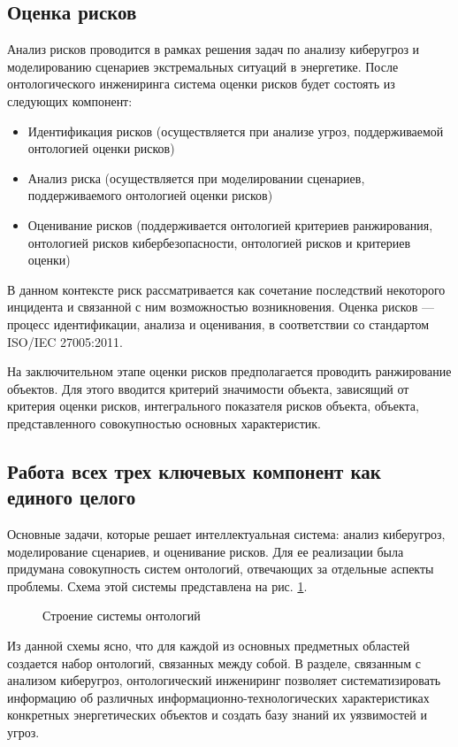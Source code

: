 \subsection{Оценка рисков}
Анализ рисков проводится в рамках решения задач по анализу киберугроз и моделированию сценариев
экстремальных ситуаций в энергетике. После онтологического инжениринга система оценки рисков будет состоять
из следующих компонент:
\begin{itemize}
\item
Идентификация рисков (осуществляется при анализе угроз, поддерживаемой онтологией оценки рисков)
\item
Анализ риска (осуществляется при моделировании сценариев, поддерживаемого онтологией оценки рисков)
\item
Оценивание рисков (поддерживается онтологией критериев ранжирования, онтологией рисков кибербезопасности,
онтологией рисков и критериев оценки)
\end{itemize}
В данном контексте риск рассматривается как сочетание последствий некоторого инцидента и связанной с ним возможностью
возникновения. Оценка рисков --- процесс идентификации, анализа и оценивания, в соответствии со стандартом
ISO/IEC 27005:2011.

На заключительном этапе оценки рисков предполагается проводить ранжирование объектов. Для этого вводится
критерий значимости объекта, зависящий от критерия оценки рисков, интегрального показателя рисков объекта,
объекта, представленного совокупностью основных характеристик.
\subsection{Работа всех трех ключевых компонент как единого целого}
Основные задачи, которые решает интеллектуальная система: анализ киберугроз, моделирование сценариев,
и оценивание рисков. Для ее реализации была придумана совокупность систем онтологий, отвечающих за
отдельные аспекты проблемы. Схема этой системы представлена на рис. \ref{dio}.

\begin{figure}[h]
    \caption{Строение системы онтологий}
    \label{dio}
\end{figure}

Из данной схемы ясно, что для каждой из основных предметных областей создается набор онтологий, связанных
между собой. В разделе, связанным с анализом киберугроз, онтологический инжениринг позволяет систематизировать
информацию об различных информационно-технологических характеристиках конкретных энергетических объектов
и создать базу знаний их уязвимостей и угроз.

